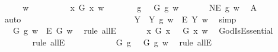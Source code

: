 \begin{isabellebody}
%
\isadelimproof
%
\endisadelimproof
%
\isatagproof
{}\isamarkupfalse%
\ {\isacharminus}\isanewline
\isacommand{{\isacharbraceleft}}\isamarkupfalse%
\isanewline
\ \ \isamarkupfalse%
\ w\ \isanewline
\ \ \isacommand{{\isacharbraceleft}}\isamarkupfalse%
\isanewline
\ \ \ \ \isamarkupfalse%
\ {\isachardoublequoteopen}{\isasymexists}x{\isachardot}\ G\ x\ w{\isachardoublequoteclose}\isanewline
\ \ \ \ \isamarkupfalse%
\ \isamarkupfalse%
\ g\ \ {}{\isacharcolon}\ {\isachardoublequoteopen}G\ g\ w{\isachardoublequoteclose}\ \isacommand{{\isachardot}{\isachardot}}\isamarkupfalse%
\isanewline
\ \ \ \ \isamarkupfalse%
\ {\isachardoublequoteopen}NE\ g\ w{\isachardoublequoteclose}\ \isamarkupfalse%
\ A{}\ \isamarkupfalse%
\ auto\ \ \ \ \ \ \ \ \ \ \ \ \ \ \ \ \ \ \ \ \ %
\isanewline
\ \ \ \ \isamarkupfalse%
\ {\isachardoublequoteopen}{\isasymforall}Y{\isachardot}\ {\isacharparenleft}{\isasymE}\ Y\ g\ w{\isacharparenright}\ {\isasymlongrightarrow}\ {\isacharparenleft}\isactrlbold {\isasymbox}\isactrlbold {\isasymexists}\isactrlsup E\ Y{\isacharparenright}\ w{\isachardoublequoteclose}\ \isamarkupfalse%
\ simp\isanewline
\ \ \ \ \isamarkupfalse%
\ {}{\isacharcolon}\ {\isachardoublequoteopen}{\isacharparenleft}{\isasymE}\ G\ g\ w{\isacharparenright}\ {\isasymlongrightarrow}\ {\isacharparenleft}\isactrlbold {\isasymbox}\isactrlbold {\isasymexists}\isactrlsup E\ G{\isacharparenright}\ w{\isachardoublequoteclose}\ \isamarkupfalse%
\ {\isacharparenleft}rule\ allE{\isacharparenright}\isanewline
\ \ \ \ \isamarkupfalse%
\ \ {\isachardoublequoteopen}{\isacharparenleft}\isactrlbold {\isasymforall}x{\isachardot}\ G\ x\ \isactrlbold {\isasymrightarrow}\ {\isacharparenleft}{\isasymE}\ G\ x{\isacharparenright}{\isacharparenright}\ w{\isachardoublequoteclose}\ \isamarkupfalse%
\ GodIsEssential\isanewline
\ \ \ \ \ \ \isamarkupfalse%
\ {\isacharparenleft}rule\ allE{\isacharparenright}\ \ \ \ \ %
\isanewline
\ \ \ \ \isamarkupfalse%
\ \ {\isachardoublequoteopen}{\isacharparenleft}G\ g\ \isactrlbold {\isasymrightarrow}\ {\isacharparenleft}{\isasymE}\ G\ g{\isacharparenright}{\isacharparenright}\ w{\isachardoublequoteclose}\ \isamarkupfalse%
\ {\isacharparenleft}rule\ allE{\isacharparenright}\isanewline

\end{isabellebody}
